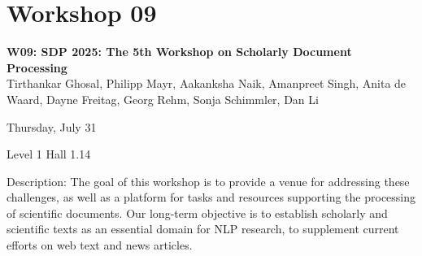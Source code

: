 \clearpage


\section[W09: SDP 2025: The 5th Workshop on Scholarly Document Processing]{Workshop 09}
\label{workshop_9}

\begin{center}
    {\Large \textbf{W09: SDP 2025: The 5th Workshop on Scholarly Document Processing}}\\

    Tirthankar Ghosal, Philipp Mayr, Aakanksha Naik, Amanpreet Singh, Anita de Waard, Dayne Freitag, Georg Rehm, Sonja Schimmler, Dan Li

    Thursday, July 31
    
    Level 1 Hall 1.14

\end{center}

Description: The goal of this workshop is to provide a venue for addressing these challenges, as well as a platform for tasks and resources supporting the processing of scientific documents. Our long-term objective is to establish scholarly and scientific texts as an essential domain for NLP research, to supplement current efforts on web text and news articles.

